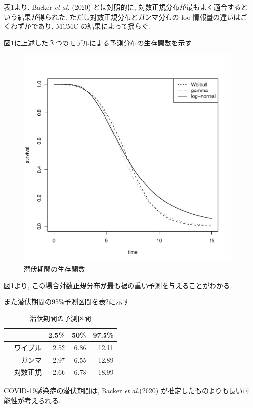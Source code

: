 \documentclass[a4paper,12pt]{jsarticle}
\begin{document}
表1より, Backer \textit{et al.} (2020) とは対照的に, 対数正規分布が最もよく適合するという結果が得られた. ただし対数正規分布とガンマ分布の loo 情報量の違いはごくわずかであり, MCMC の結果によって揺らぐ. 

図\ref{survfit}に上述した３つのモデルによる予測分布の生存関数を示す. 

\begin{figure}
\centering
\includegraphics[width=12cm]{survfit.pdf}
\caption{潜伏期間の生存関数}
\label{survfit}
\end{figure}

図\ref{survfit}より, この場合対数正規分布が最も裾の重い予測を与えることがわかる.

また潜伏期間の95\%予測区間を表2に示す. 

\begin{table}[ht]
\centering
\caption{潜伏期間の予測区間}
\begin{tabular}{rrrr}
  \hline
 & 2.5\% & 50\% & 97.5\% \\ 
  \hline
ワイブル　& 2.52 & 6.86 & 12.11 \\ 
ガンマ　& 2.97 & 6.55 & 12.89 \\ 
対数正規　& 2.66 & 6.78 & 18.99 \\ 
   \hline
\end{tabular}
\end{table}

COVID-19感染症の潜伏期間は, Backer \textit{et al.}(2020) が推定したものよりも長い可能性が考えられる.
\end{document}

